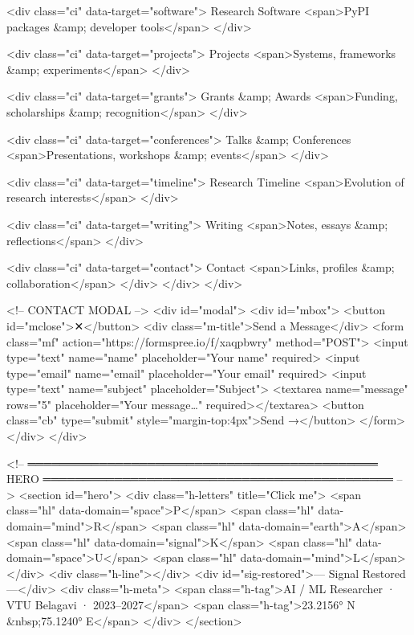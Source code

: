     <div class="ci" data-target="software">
      Research Software
      <span>PyPI packages &amp; developer tools</span>
    </div>

    <div class="ci" data-target="projects">
      Projects
      <span>Systems, frameworks &amp; experiments</span>
    </div>

    <div class="ci" data-target="grants">
      Grants &amp; Awards
      <span>Funding, scholarships &amp; recognition</span>
    </div>

    <div class="ci" data-target="conferences">
      Talks &amp; Conferences
      <span>Presentations, workshops &amp; events</span>
    </div>

    <div class="ci" data-target="timeline">
      Research Timeline
      <span>Evolution of research interests</span>
    </div>

    <div class="ci" data-target="writing">
      Writing
      <span>Notes, essays &amp; reflections</span>
    </div>

    <div class="ci" data-target="contact">
      Contact
      <span>Links, profiles &amp; collaboration</span>
    </div>
  </div>
</div>

<!-- CONTACT MODAL -->
<div id="modal">
  <div id="mbox">
    <button id="mclose">✕</button>
    <div class="m-title">Send a Message</div>
    <form class="mf" action="https://formspree.io/f/xaqpbwry" method="POST">
      <input type="text"  name="name"    placeholder="Your name"    required>
      <input type="email" name="email"   placeholder="Your email"   required>
      <input type="text"  name="subject" placeholder="Subject">
      <textarea name="message" rows="5"  placeholder="Your message…" required></textarea>
      <button class="cb" type="submit" style="margin-top:4px">Send →</button>
    </form>
  </div>
</div>

<!-- ════════════════════════════════════════════
     HERO
════════════════════════════════════════════ -->
<section id="hero">
  <div class="h-letters" title="Click me">
    <span class="hl" data-domain="space">P</span>
    <span class="hl" data-domain="mind">R</span>
    <span class="hl" data-domain="earth">A</span>
    <span class="hl" data-domain="signal">K</span>
    <span class="hl" data-domain="space">U</span>
    <span class="hl" data-domain="mind">L</span>
  </div>
  <div class="h-line"></div>
  <div id="sig-restored">— Signal Restored —</div>
  <div class="h-meta">
    <span class="h-tag">AI / ML Researcher · VTU Belagavi · 2023–2027</span>
    <span class="h-tag">23.2156° N &nbsp;75.1240° E</span>
  </div>
</section>

